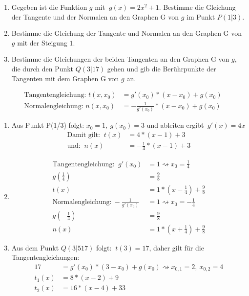 \cas
\begin{enumerate}
	\item Gegeben ist die Funktion $g$ mit $\ g(x)=2x^2+1$. Bestimme die Gleichung der Tangente und der Normalen an den Graphen G von $g$ im Punkt $P(1|3)$.
  \item Bestimme die Gleichung der Tangente und Normalen an den Graphen G von $g$ mit der Steigung $1$.
  \item Bestimme die Gleichungen der beiden Tangenten an den Graphen G von $g$, die durch den Punkt $Q(3|17)$ gehen und gib die Berührpunkte der Tangenten mit dem Graphen G von $g$ an.
\end{enumerate}
\begin{lsg}{}
	\begin{align*}
		\text{Tangentengleichung: }  t(x,x_0)&=g'(x_0)*(x-x_0)+g(x_0)\\
	\text{Normalengleichung: }n(x,x_0)&=-\frac{1}{g'(x_0)}*(x-x_0)+g(x_0)
	\end{align*}

	\begin{enumerate}
		\item Aus Punkt P(1/3) folgt: $x_0=1,\ g(x_0)=3$ und ableiten ergibt $\ g'(x)=4x$
		\begin{align*}
		\text{Damit gilt: }\ t(x)&=4*(x-1)+3 \\
		\text{und: }\ n(x)&=-\frac{1}{4}*(x-1)+3
		\end{align*}
		\item \begin{align*}
			\text{Tangentengleichung: }\ g'(x_0)&=1 \rightsquigarrow x_0=\frac{1}{4}\\
			g\left(\frac{1}{4}\right)&=\frac{9}{8}\\
			t(x)&=1*\left(x-\frac{1}{4}\right)+\frac{9}{8}\\
			\text{Normalengleichung:}\ -\frac{1}{g'(x_0)}&=1 \rightsquigarrow x_0=-\frac{1}{4}\\
			g\left(-\frac{1}{4}\right)&=\frac{9}{8}\\
			n(x)&=1*\left(x+\frac{1}{4}\right)+\frac{9}{8}
			\end{align*}
			\item Aus dem Punkt $Q(3|517)$ folgt: $\ t(3)=17$, daher gilt für die Tangentengleichungen:\begin{align*}
			17&=g'(x_0)*(3-x_0)+g(x_0) \rightsquigarrow x_{0,1}=2,\ x_{0,2}=4\\
			t_1(x)&=8*(x-2)+9\\
			t_2(x)&=16*(x-4)+33
			\end{align*}
	\end{enumerate}
\end{lsg}



